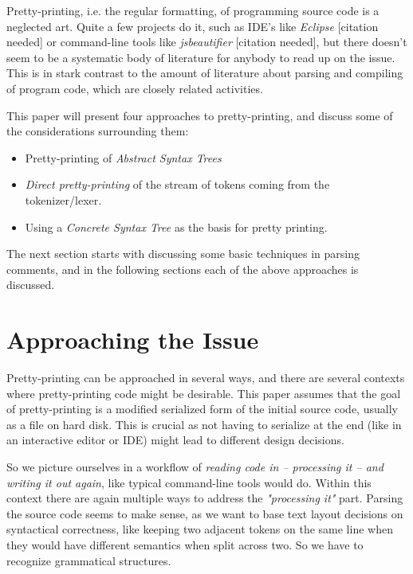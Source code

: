 \documentclass[11pt,a4paper]{article}
\begin{document}

Pretty-printing, i.e. the regular formatting, of programming source code is a neglected art. Quite a few projects do it, such as IDE's like \emph{Eclipse} [citation needed] or command-line tools like \emph{jsbeautifier} [citation needed], but there doesn't seem to be a systematic body of literature for anybody to read up on the issue. This is in stark contrast to the amount of literature about parsing and compiling of program code, which are closely related activities.

This paper will present four approaches to pretty-printing, and discuss some of the considerations surrounding them:
\begin{itemize}
  \item Pretty-printing of \emph{Abstract Syntax Trees}
  \item \emph{Direct pretty-printing} of the stream of tokens coming from the tokenizer/lexer.
  \item Using a \emph{Concrete Syntax Tree} as the basis for pretty printing.
\end{itemize}

The next section starts with discussing some basic techniques in parsing comments, and in the following sections each of the above approaches is discussed.



\section{Approaching the Issue}

Pretty-printing can be approached in several ways, and there are several
contexts where pretty-printing code might be desirable. This paper assumes that
the goal of pretty-printing is a modified serialized form of the initial source
code, usually as a file on hard disk. This is crucial as not having to serialize
at the end (like in an interactive editor or IDE) might lead to different design
decisions.

So we picture ourselves in a workflow of \emph{reading code in --
processing it -- and writing it out again}, like typical command-line tools
would do. Within this context there are again multiple ways to address the
\emph{"processing it"} part. Parsing the source code seems to make sense, as we
want to base text layout decisions on syntactical correctness, like keeping two
adjacent tokens on the same line when they would have different semantics when
split across two. So we have to recognize grammatical structures.
\end{document}
